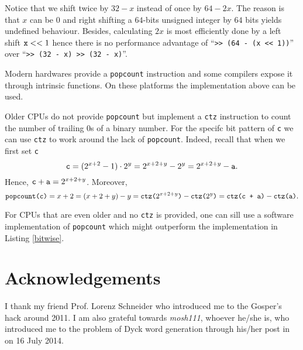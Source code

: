 \documentclass[a4paper]{article}
\begin{document}
Notice that we shift twice by $32 - x$ instead of once by $64 - 2x$.
The reason is that $x$ can be $0$ and right shifting a $64$-bits unsigned integer by $64$ bits yields undefined behaviour.
Besides, calculating $2x$ is most efficiently done by a left shift $\verb!x! << 1$ hence there is no performance advantage of ``\verb!>> (64 - (x << 1))!'' over ``\verb!>> (32 - x) >> (32 - x)!''.

Modern hardwares provide a \verb!popcount! instruction and some compilers expose it through intrinsic functions.
On these platforms the implementation above can be used.

Older CPUs do not provide \verb!popcount! but implement a \verb!ctz! instruction to count the number of trailing 0s of a binary number.
For the specifc bit pattern of \verb!c! we can use \verb!ctz! to work around the lack of \verb!popcount!.
Indeed, recall that when we first set \verb!c!
\[
\verb!c! = (2^{x + 2} - 1)\cdot 2^y = 2^{x + 2 + y} - 2^y = 2^{x + 2 + y} - \verb!a!.
\]
Hence, $\verb!c! + \verb!a! = 2^{x + 2 + y}$.
Moreover,
\[
\verb!popcount(c)! = x + 2 = (x + 2 + y) - y = \verb!ctz(!2^{x + 2 + y}\verb!)! - \verb!ctz(!2^y\verb!)! = \verb!ctz(c + a)! - \verb!ctz(a)!.
\]

For CPUs that are even older and no \verb!ctz! is provided, one can sill use a software implementation \cite{Wikipedia-Popcount} of \verb!popcount! which might outperform the implementation in Listing \ref{bitwise}.



\section{Acknowledgements}

I thank my friend Prof. Lorenz Schneider who introduced me to the Gosper's hack around 2011.
I am also grateful towards {\em mosh111}, whoever he/she is, who introduced me to the problem of Dyck word generation through his/her post in \cite{CareerCup} on 16 July 2014.
\end{document}
